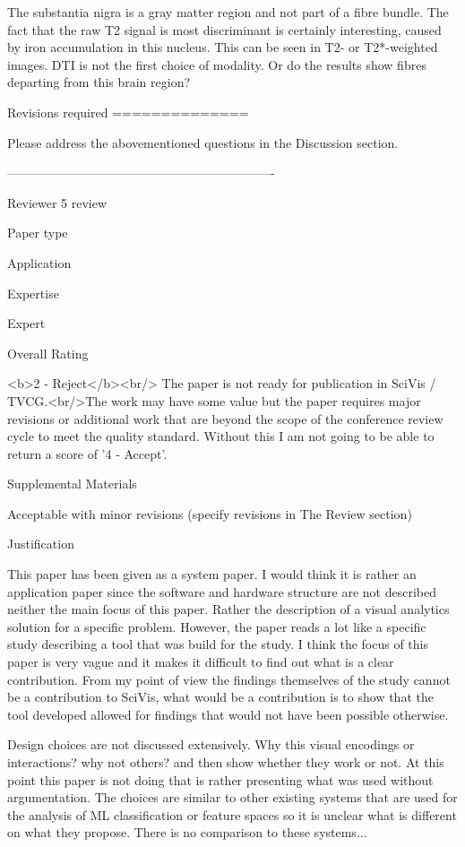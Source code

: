     The substantia nigra is a gray matter region and not part of a fibre bundle. The
    fact that the raw T2 signal is most discriminant is certainly interesting, caused
    by iron accumulation in this nucleus. This can be seen in T2- or T2*-weighted
    images. DTI is not the first choice of modality. Or do the results show fibres
    departing from this brain region?


    Revisions required
    ==============

    Please address the abovementioned questions in the Discussion section.

----------------------------------------------------------------

Reviewer 5 review

  Paper type

    Application

  Expertise

    Expert

  Overall Rating

    <b>2 - Reject</b><br/> The paper is not ready for publication in SciVis /
    TVCG.<br/>The work may have some value but the paper requires major revisions or
    additional work that are beyond the scope of the conference review cycle to meet
    the quality standard. Without this I am not going to be able to return a score of
    '4 - Accept'.

  Supplemental Materials

    Acceptable with minor revisions (specify revisions in The Review section)

  Justification

    This paper has been given as a system paper. I would think it is rather an
    application paper since the software and hardware structure are not described
    neither the main focus of this paper. Rather the description of a visual analytics
    solution for a specific problem.
    However, the paper reads a lot like a specific study describing a tool that was
    build for the study. I think the focus of this paper is very vague and it makes it
    difficult to find out what is a clear contribution.
    From my point of view the findings themselves of the study cannot be a
    contribution to  SciVis, what would be a contribution is to show that the tool
    developed allowed for findings that would not have been possible otherwise.

    Design choices are not discussed extensively. Why this visual encodings or
    interactions? why not others? and then show whether they work or not. At this
    point this paper is not doing that is rather presenting what was used without
    argumentation. The choices are similar to other existing systems that are used for
    the analysis of ML classification or feature spaces so it is unclear what is
    different on what they propose. There is no comparison to these systems...

